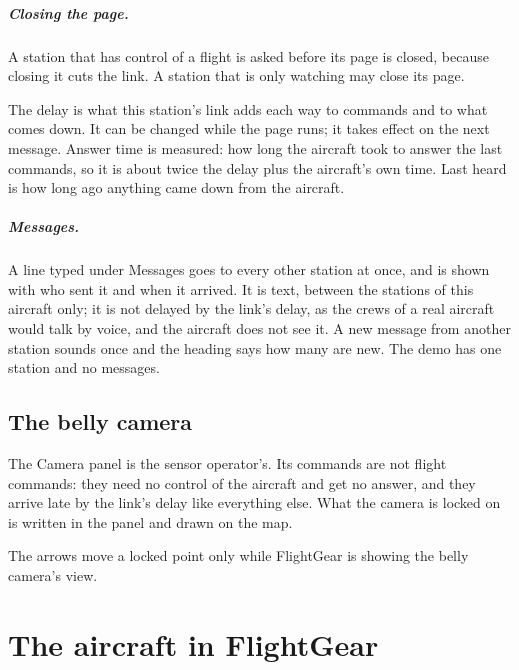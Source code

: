 \documentclass[11pt,a4paper,oneside]{book}
\newcommand{\Tab}[1]{}
\newcommand{\ann}[1]{\textsf{#1}}
\begin{document}
\paragraph{Closing the page.} A station that has control of a flight is asked before its page is closed, because
closing it cuts the link. A station that is only watching may close its page.
\begin{center}\small\Tab{ctl_station}\end{center}
The delay is what this station's link adds each way to commands and to what comes down. It can be changed while the
page runs; it takes effect on the next message. \ann{Answer time} is measured: how long the aircraft took to answer
the last commands, so it is about twice the delay plus the aircraft's own time. \ann{Last heard} is how long ago anything
came down from the aircraft.
\paragraph{Messages.} A line typed under \ann{Messages} goes to every other station at once, and is shown with who sent
it and when it arrived. It is text, between the stations of this aircraft only; it is not delayed by the link's delay, as
the crews of a real aircraft would talk by voice, and the aircraft does not see it. A new message from another station
sounds once and the heading says how many are new. The demo has one station and no messages.
\begin{center}\small\Tab{ctl_messages}\end{center}

\section{The belly camera}\label{sec:camera}
The \ann{Camera} panel is the sensor operator's. Its commands are not flight commands: they need no control of the
aircraft and get no answer, and they arrive late by the link's delay like everything else. What the camera is locked
on is written in the panel and drawn on the map.
\begin{center}\small\Tab{ctl_camera}\end{center}
The arrows move a locked point only while FlightGear is showing the belly camera's view.

\chapter{The aircraft in FlightGear}
\end{document}

